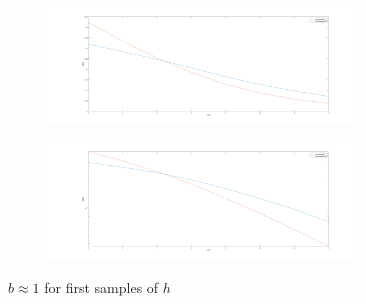 \documentclass[12pt]{article}
\begin{document}
\begin{enumerate}
		\begin{figure}[h!]
			\centering
			\begin{subfigure}[b]{0.8\textwidth}
				\centering
				\includegraphics[width=0.9\textwidth]{fig6_b.png}
			\end{subfigure}
			\begin{subfigure}[b]{0.8\textwidth}
				\centering
				\includegraphics[width=0.9\textwidth]{fig7_b.png}
			\end{subfigure}
			\caption{$b\approx 1$ for first samples of $h$}
		\end{figure}
	

\end{enumerate}
\end{document}
